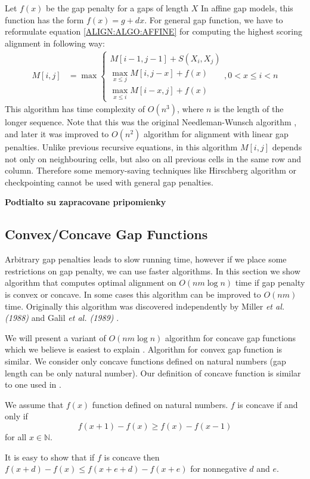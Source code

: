 Let $f(x)$ be the gap penalty for a gaps of length $X$
In 
affine gap models, this function has the form $f(x)=g+dx$. For general gap function, we have to
reformulate equation \ref{ALIGN:ALGO:AFFINE} for computing the highest scoring
alignment in following way:
\begin{align}
M[i,j] &= \max
\begin{cases}
 M[i-1,j-1]+S(X_i,X_j)\\
 \max_{x\leq j}M[i,j-x]+f(x)\\
 \max_{x\leq i}M[i-x,j]+f(x)
\end{cases}, 0<x\leq i<n\label{ALIGN:ARBITRARYGAPEQUATION}
\end{align}
This algorithm has time complexity of $O(n^3)$, where $n$ is the length of the
longer sequence. Note that this was the original Needleman-Wunsch 
algorithm \cite{Needleman1970}, and later it was improved to $O(n^2)$ algorithm
\cite{Sankoff1972} for alignment with linear gap penalties.
Unlike previous recursive equations, in this algorithm $M[i,j]$ depends not
only on neighbouring cells, but also on all previous cells in the same row and column.
Therefore some memory-saving techniques like Hirschberg algorithm or checkpointing cannot be
used with general gap penalties.

\bigskip
{\Large\bf Podtialto su zapracovane pripomienky }
\bigskip

\subsection{Convex/Concave Gap Functions}\label{SECTION:CONVEX}

Arbitrary gap penalties leads to slow running time, however if we place some
restrictions on gap penalty, we can use faster algorithms. In this section we
show algorithm that computes optimal alignment on $O(nm\log n)$ time if gap
penalty is convex or concave. In some cases this algorithm can be improved to
$O(nm)$ time. Originally this algorithm was discovered independently by Miller
{\it et al. (1988)} and Galil {\it et al. (1989)} \nocite{Miller1988,Galil1989}.

We will present a variant of $O(nm\log n)$ algorithm for concave gap functions which
we believe is easiest to explain . Algorithm for convex gap function is similar.
We consider only concave functions defined on natural numbers (gap length can be only
natural number). Our definition of concave function is similar to one used in
\cite{GusfieldBook}.

\begin{definition}
We assume that $f(x)$ function defined on natural numbers. $f$
is concave if and only if 
\[f(x+1)-f(x)\geq f(x)-f(x-1)\]
for all $x\in\mathbb{N}$.
\end{definition}
\begin{note}
It is easy to show that if $f$ is concave then $f(x+d)-f(x) \leq f(x+e+d) -
f(x+e)$ for nonnegative $d$ and $e$.
\end{note}

